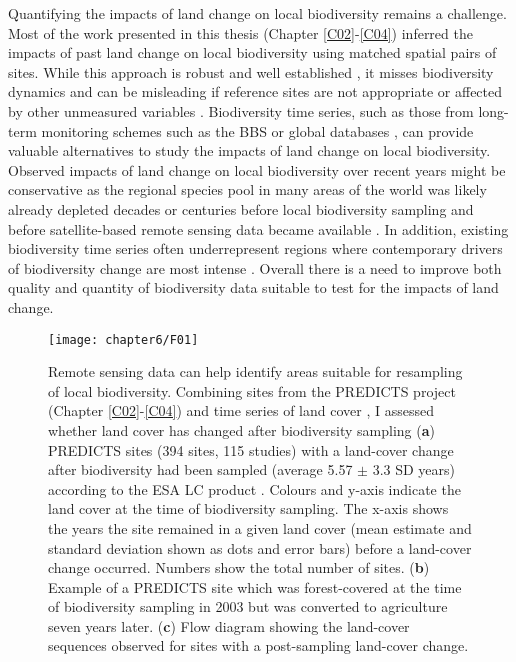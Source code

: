 Quantifying the impacts of land change on local biodiversity remains a challenge. Most of the work presented in this thesis (Chapter \ref{C02}-\ref{C04}) inferred the impacts of past land change on local biodiversity using matched spatial pairs of sites. While this approach is robust and well established \citep{Purvis2018}, it misses biodiversity dynamics and can be misleading if reference sites are not appropriate or affected by other unmeasured variables \citep{Franca2016,Jung2016,DePalma2018}. Biodiversity time series, such as those from long-term monitoring schemes such as the BBS \citep{Pardieck2018} or global databases \citep[\eg BioTime, ][]{Dornelas2018}, can provide valuable alternatives to study the impacts of land change on local biodiversity. Observed impacts of land change on local biodiversity over recent years might be conservative as the regional species pool in many areas of the world was likely already depleted decades or centuries before local biodiversity sampling and before satellite-based remote sensing data became available \citep{Newbold2016a,Mihoub2017}. In addition, existing biodiversity time series often underrepresent regions where contemporary drivers of biodiversity change are most intense \citep{Gonzalez2016,Cardinale2018}. Overall there is a need to improve both quality and quantity of biodiversity data suitable to test for the impacts of land change.

\begin{figure}[ht]
\centering
\texttt{[image: chapter6/F01]}
\caption{ Remote sensing data can help identify areas suitable for resampling of local biodiversity. Combining sites from the PREDICTS project (Chapter \ref{C02}-\ref{C04}) and time series of land cover \citep{ESA2017}, I assessed whether land cover has changed after biodiversity sampling (\textbf{a}) PREDICTS sites (394 sites, 115 studies) with a land-cover change after biodiversity had been sampled (average 5.57 $\pm$ 3.3 SD years) according to the ESA LC product \citep{ESA2017}. Colours and y-axis indicate the land cover at the time of biodiversity sampling. The x-axis shows the years the site remained in a given land cover (mean estimate and standard deviation shown as dots and error bars) before a land-cover change occurred. Numbers show the total number of sites. (\textbf{b}) Example of a PREDICTS site which was forest-covered at the time of biodiversity sampling in 2003 but was converted to agriculture seven years later. (\textbf{c}) Flow diagram showing the land-cover sequences observed for sites with a post-sampling land-cover change.}
\label{F06_01}
\end{figure}

